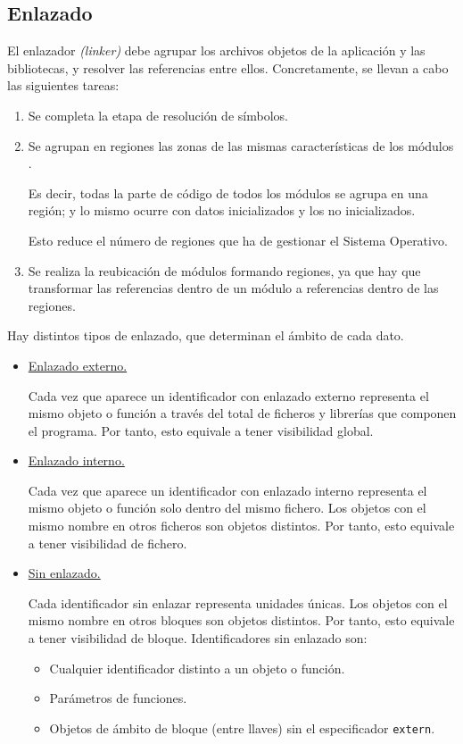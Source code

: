 \subsection{Enlazado}
El enlazador \textit{(linker)} debe agrupar los archivos objetos de la aplicación y las bibliotecas, y resolver las referencias entre ellos. Concretamente, se llevan a cabo las siguientes tareas:
\begin{enumerate}
    \item Se completa la etapa de resolución de símbolos.

    \item Se agrupan en regiones las zonas de las mismas características de los módulos .

    Es decir, todas la parte de código de todos los módulos se agrupa en una región; y lo mismo ocurre con datos inicializados y los no inicializados.

    Esto reduce el número de regiones que ha de gestionar el Sistema Operativo.

    \item Se realiza la reubicación de módulos formando regiones, ya que hay que transformar las referencias dentro de un módulo a referencias dentro de las regiones.
\end{enumerate}

Hay distintos tipos de enlazado, que determinan el ámbito de cada dato.
\begin{itemize}
    \item \underline{Enlazado externo.}
    
    Cada vez que aparece un identificador con enlazado externo representa el mismo objeto o función a través del total de ficheros y librerías que componen el programa. Por tanto, esto equivale a tener visibilidad global.

    \item \underline{Enlazado interno.}
    
    Cada vez que aparece un identificador con enlazado interno representa el mismo objeto o función solo dentro del mismo fichero. Los objetos con el mismo nombre en otros ficheros son objetos distintos. Por tanto, esto equivale a tener visibilidad de fichero.

    \item \underline{Sin enlazado.}
    
    Cada identificador sin enlazar representa unidades únicas. Los objetos con el mismo nombre en otros bloques son objetos distintos. Por tanto, esto equivale a tener visibilidad de bloque. Identificadores sin enlazado son:
    \begin{itemize}
        \item Cualquier identificador distinto a un objeto o función.
        \item Parámetros de funciones.
        \item Objetos de ámbito de bloque (entre llaves) sin el especificador \verb|extern|. 
    \end{itemize}
\end{itemize}


